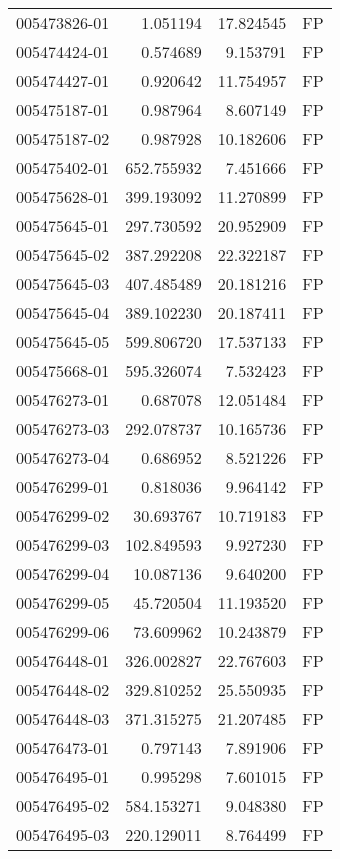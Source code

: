 \begin{tabular}{lrrl}
005473826-01 &    1.051194 &    17.824545 &   FP \\
005474424-01 &    0.574689 &     9.153791 &   FP \\
005474427-01 &    0.920642 &    11.754957 &   FP \\
005475187-01 &    0.987964 &     8.607149 &   FP \\
005475187-02 &    0.987928 &    10.182606 &   FP \\
005475402-01 &  652.755932 &     7.451666 &   FP \\
005475628-01 &  399.193092 &    11.270899 &   FP \\
005475645-01 &  297.730592 &    20.952909 &   FP \\
005475645-02 &  387.292208 &    22.322187 &   FP \\
005475645-03 &  407.485489 &    20.181216 &   FP \\
005475645-04 &  389.102230 &    20.187411 &   FP \\
005475645-05 &  599.806720 &    17.537133 &   FP \\
005475668-01 &  595.326074 &     7.532423 &   FP \\
005476273-01 &    0.687078 &    12.051484 &   FP \\
005476273-03 &  292.078737 &    10.165736 &   FP \\
005476273-04 &    0.686952 &     8.521226 &   FP \\
005476299-01 &    0.818036 &     9.964142 &   FP \\
005476299-02 &   30.693767 &    10.719183 &   FP \\
005476299-03 &  102.849593 &     9.927230 &   FP \\
005476299-04 &   10.087136 &     9.640200 &   FP \\
005476299-05 &   45.720504 &    11.193520 &   FP \\
005476299-06 &   73.609962 &    10.243879 &   FP \\
005476448-01 &  326.002827 &    22.767603 &   FP \\
005476448-02 &  329.810252 &    25.550935 &   FP \\
005476448-03 &  371.315275 &    21.207485 &   FP \\
005476473-01 &    0.797143 &     7.891906 &   FP \\
005476495-01 &    0.995298 &     7.601015 &   FP \\
005476495-02 &  584.153271 &     9.048380 &   FP \\
005476495-03 &  220.129011 &     8.764499 &   FP \\

\end{tabular}
